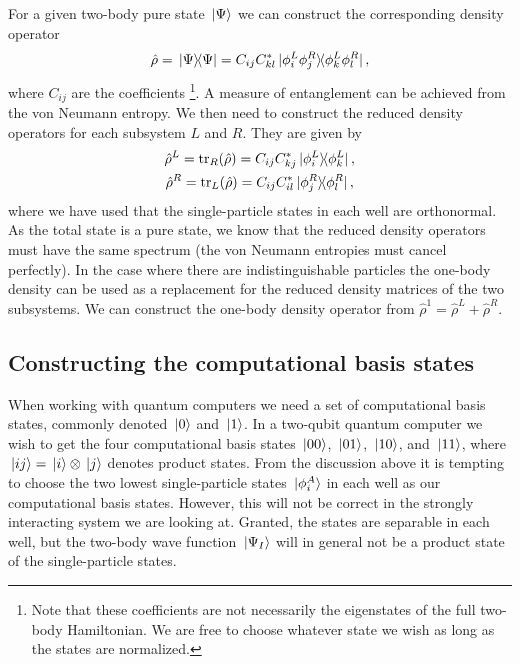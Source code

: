 \documentclass[twocolumn,superscriptaddress,unsortedaddress,
 amsmath,amssymb,
 aps,
]{revtex4-2}
\begin{document}
        For a given two-body pure state $\ket*{\Psi}$ we can construct the
        corresponding density operator
        \begin{align*}
            \hat{\rho} = \dyad*{\Psi}{\Psi}
            = C_{ij} C^{*}_{kl} \dyad*{\phi^L_i \phi^R_j}{
                \phi^L_k \phi^R_l
            },
        \end{align*}
        where $C_{ij}$ are the coefficients \footnote{
            Note that these coefficients are not necessarily the eigenstates
            of the full two-body Hamiltonian.
            We are free to choose whatever state we wish as long as the states
            are normalized.
        }.
        A measure of entanglement can be achieved from the von Neumann entropy.
        We then need to construct the reduced density operators for each
        subsystem $L$ and $R$.
        They are given by
        \begin{gather*}
            \hat{\rho}^L
            = \tr_R \! \qty(\hat{\rho})
            = C_{ij} C^{*}_{kj} \dyad*{\phi^L_i}{\phi^L_k},
            \\
            \hat{\rho}^R
            = \tr_{L} \! \qty(\hat{\rho})
            = C_{ij} C^{*}_{il} \dyad*{\phi^R_j}{\phi^R_l},
        \end{gather*}
        where we have used that the single-particle states in each well are
        orthonormal.
        As the total state is a pure state, we know that the reduced density
        operators must have the same spectrum (the von Neumann entropies must
        cancel perfectly).
        In the case where there are indistinguishable particles the one-body
        density can be used as a replacement for the reduced density matrices
        of the two subsystems.
        We can construct the one-body density operator from $\hat{\rho}^1
        = \hat{\rho}^L + \hat{\rho}^R$.


    \subsection{Constructing the computational basis states}
        When working with quantum computers we need a set of computational
        basis states, commonly denoted $\ket*{0}$ and $\ket*{1}$.
        In a two-qubit quantum computer we wish to get the four computational
        basis states $\ket*{00}$, $\ket*{01}$, $\ket*{10}$, and $\ket*{11}$,
        where $\ket*{ij} = \ket*{i} \otimes \ket*{j}$ denotes product states.
        From the discussion above it is tempting to choose the two lowest
        single-particle states $\ket*{\phi^{A}_i}$ in each well as our
        computational basis states.
        However, this will not be correct in the strongly interacting system
        we are looking at.
        Granted, the states are separable in each well, but the two-body
        wave function $\ket*{\Psi_I}$ will in general not be a product state
        of the single-particle states.
\end{document}
